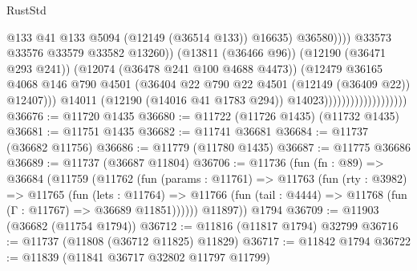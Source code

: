 \begin{lexlean}{RustStd}
\begin{coremodule}
                                                          @133
                                                          @41
                                                          @133
                                                          @5094
                                                          (@12149 (@36514 @133))
                                                          @16635)
                                                        @36580))))
                                                @33573
                                                @33576
                                                @33579
                                                @33582
                                                @13260))
                                            (@13811 (@36466 @96))
                                            (@12190 (@36471 @293 @241))
                                            (@12074 (@36478 @241 @100 @4688 @4473))
                                            (@12479
                                              @36165
                                              @4068
                                              @146
                                              @790
                                              @4501
                                              (@36404
                                                @22
                                                @790
                                                @22
                                                @4501
                                                (@12149 (@36409 @22))
                                                @12407)))
                                          @14011
                                          (@12190 (@14016 @41 @1783 @294))
                                          @14023)))))))))))))))))))
@36676 := @11720 @1435
@36680 := @11722 (@11726 @1435) (@11732 @1435)
@36681 := @11751 @1435
@36682 := @11741 @36681
@36684 := @11737 (@36682 @11756)
@36686 := @11779 (@11780 @1435)
@36687 := @11775 @36686
@36689 := @11737 (@36687 @11804)
@36706 := @11736
    (fun (fn : @89) =>
    @36684
      (@11759
        (@11762
          (fun (params : @11761) =>
          @11763
            (fun (rty : @3982) =>
            @11765
              (fun (lets : @11764) =>
              @11766 (fun (tail : @4444) => @11768 (fun (Γ : @11767) => @36689 @11851))))))
        @11897))
    @1794
@36709 := @11903 (@36682 (@11754 @1794))
@36712 := @11816 (@11817 @1794) @32799
@36716 := @11737 (@11808 (@36712 @11825) @11829)
@36717 := @11842 @1794
@36722 := @11839 (@11841 @36717 @32802 @11797 @11799)

\end{coremodule}
\end{lexlean}
